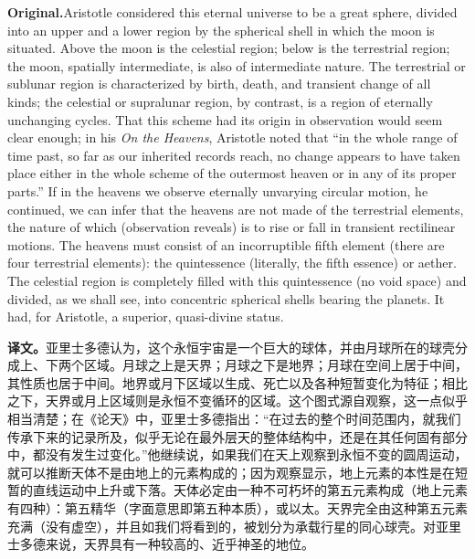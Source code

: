 \documentclass[UTF8]{ctexart}
\newcommand{\orig}{\par\noindent\textbf{Original.}\quad}
\newcommand{\zh}{\par\noindent\textbf{译文。}\quad}
\begin{document}
\orig Aristotle considered this eternal universe to be a great sphere, divided into an upper and a lower region by the spherical shell in which the moon is situated. Above the moon is the celestial region; below is the terrestrial region; the moon, spatially intermediate, is also of intermediate nature. The terrestrial or sublunar region is characterized by birth, death, and transient change of all kinds; the celestial or supralunar region, by contrast, is a region of eternally unchanging cycles. That this scheme had its origin in observation would seem clear enough; in his \textit{On the Heavens}, Aristotle noted that ``in the whole range of time past, so far as our inherited records reach, no change appears to have taken place either in the whole scheme of the outermost heaven or in any of its proper parts.'' If in the heavens we observe eternally unvarying circular motion, he continued, we can infer that the heavens are not made of the terrestrial elements, the nature of which (observation reveals) is to rise or fall in transient rectilinear motions. The heavens must consist of an incorruptible fifth element (there are four terrestrial elements): the quintessence (literally, the fifth essence) or aether. The celestial region is completely filled with this quintessence (no void space) and divided, as we shall see, into concentric spherical shells bearing the planets. It had, for Aristotle, a superior, quasi-divine status.

\zh 亚里士多德认为，这个永恒宇宙是一个巨大的球体，并由月球所在的球壳分成上、下两个区域。月球之上是天界；月球之下是地界；月球在空间上居于中间，其性质也居于中间。地界或月下区域以生成、死亡以及各种短暂变化为特征；相比之下，天界或月上区域则是永恒不变循环的区域。这个图式源自观察，这一点似乎相当清楚；在《论天》中，亚里士多德指出：“在过去的整个时间范围内，就我们传承下来的记录所及，似乎无论在最外层天的整体结构中，还是在其任何固有部分中，都没有发生过变化。”他继续说，如果我们在天上观察到永恒不变的圆周运动，就可以推断天体不是由地上的元素构成的；因为观察显示，地上元素的本性是在短暂的直线运动中上升或下落。天体必定由一种不可朽坏的第五元素构成（地上元素有四种）：第五精华（字面意思即第五种本质），或以太。天界完全由这种第五元素充满（没有虚空），并且如我们将看到的，被划分为承载行星的同心球壳。对亚里士多德来说，天界具有一种较高的、近乎神圣的地位。
\end{document}
